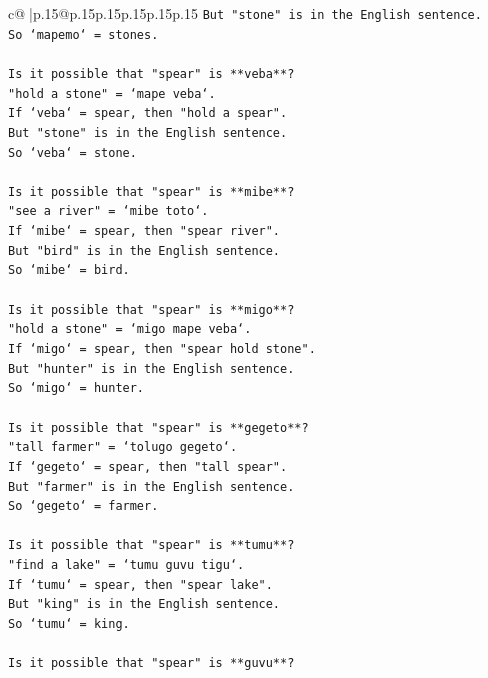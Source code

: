 \documentclass{article}
\begin{document}
{\begin{supertabular}{c@{$\;$}|p{.15\linewidth}@{}p{.15\linewidth}p{.15\linewidth}p{.15\linewidth}p{.15\linewidth}p{.15\linewidth}}
{{{\texttt{But "stone" is in the English sentence.} \\
\texttt{So `mapemo` = stones.} \\
\\ 
\texttt{Is it possible that "spear" is **veba**?} \\
\texttt{"hold a stone" = `mape veba`.} \\
\texttt{If `veba` = spear, then "hold a spear".} \\
\texttt{But "stone" is in the English sentence.} \\
\texttt{So `veba` = stone.} \\
\\ 
\texttt{Is it possible that "spear" is **mibe**?} \\
\texttt{"see a river" = `mibe toto`.} \\
\texttt{If `mibe` = spear, then "spear river".} \\
\texttt{But "bird" is in the English sentence.} \\
\texttt{So `mibe` = bird.} \\
\\ 
\texttt{Is it possible that "spear" is **migo**?} \\
\texttt{"hold a stone" = `migo mape veba`.} \\
\texttt{If `migo` = spear, then "spear hold stone".} \\
\texttt{But "hunter" is in the English sentence.} \\
\texttt{So `migo` = hunter.} \\
\\ 
\texttt{Is it possible that "spear" is **gegeto**?} \\
\texttt{"tall farmer" = `tolugo gegeto`.} \\
\texttt{If `gegeto` = spear, then "tall spear".} \\
\texttt{But "farmer" is in the English sentence.} \\
\texttt{So `gegeto` = farmer.} \\
\\ 
\texttt{Is it possible that "spear" is **tumu**?} \\
\texttt{"find a lake" = `tumu guvu tigu`.} \\
\texttt{If `tumu` = spear, then "spear lake".} \\
\texttt{But "king" is in the English sentence.} \\
\texttt{So `tumu` = king.} \\
\\ 
\texttt{Is it possible that "spear" is **guvu**?} \\
}}}
\end{supertabular}}
\end{document}
